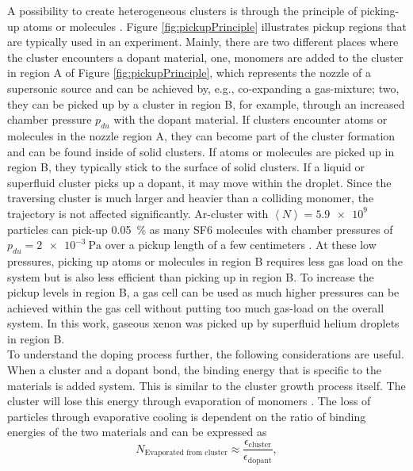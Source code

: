 A possibility to create heterogeneous clusters is through the principle of picking-up atoms or molecules \citep{Haberland-1994-Springer}. Figure \ref{fig:pickupPrinciple} illustrates pickup regions that are typically used in an experiment. Mainly, there are two different places where the cluster encounters a dopant material, one, monomers are added to the cluster in region A of Figure \ref{fig:pickupPrinciple}, which represents the nozzle of a supersonic source and can be achieved by, e.g., co-expanding a gas-mixture; two, they can be picked up by a cluster in region B, for example, through an increased chamber pressure $p_{du}$ with the dopant material. If clusters encounter atoms or molecules in the nozzle region A, they can become part of the cluster formation and can be found inside of solid clusters. If atoms or molecules are picked up in region B, they typically stick to the surface of solid clusters. If a liquid or superfluid cluster picks up a dopant, it may move within the droplet. Since the traversing cluster is much larger and heavier than a colliding monomer, the trajectory is not affected significantly. Ar-cluster with $\left\langle N\right\rangle = \num{5.9e9}$ particles can pick-up \SI{0.05}{\percent} as many SF6 molecules with chamber pressures of $p_{du}=\SI{2e-3}{\pascal}$ over a pickup length of a few centimeters \citep{Gough-1985-JChemPhys}. At these low pressures, picking up atoms or molecules in region B requires less gas load on the system but is also less efficient than picking up in region B. To increase the pickup levels in region B, a gas cell can be used as much higher pressures can be achieved within the gas cell without putting too much gas-load on the overall system. In this work, gaseous xenon was picked up by superfluid helium droplets in region B.\\[1\baselineskip]
%
To understand the doping process further, the following considerations are useful. When a cluster and a dopant bond, the binding energy that is specific to the materials is added system. This is similar to the cluster growth process itself. The cluster will lose this energy through evaporation of monomers \citep{Gomez-2011-JCP}. The loss of particles through evaporative cooling is dependent on the ratio of binding energies of the two materials and can be expressed as
\begin{equation}
N_{\text{Evaporated from cluster}} \approx \frac{\epsilon_{\text{cluster}}}{\epsilon_{\text{dopant}}},
\label{eq:evaporated-amount}
\end{equation}
